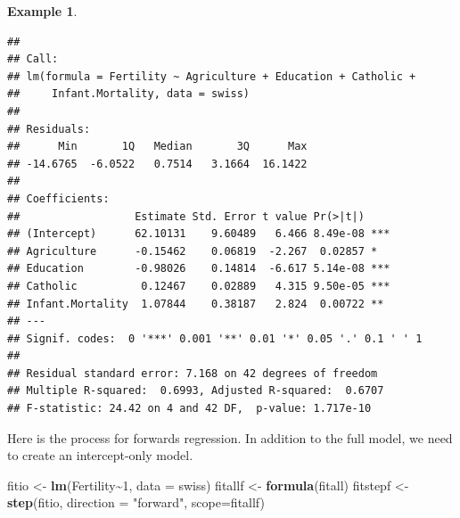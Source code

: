 \documentclass[
]{book}
\newenvironment{Shaded}{\begin{snugshade}}{\end{snugshade}}
\newcommand{\AttributeTok}[1]{\textcolor[rgb]{0.13,0.29,0.53}{#1}}
\newcommand{\DecValTok}[1]{\textcolor[rgb]{0.00,0.00,0.81}{#1}}
\newcommand{\FunctionTok}[1]{\textcolor[rgb]{0.13,0.29,0.53}{\textbf{#1}}}
\newcommand{\NormalTok}[1]{#1}
\newcommand{\OtherTok}[1]{\textcolor[rgb]{0.56,0.35,0.01}{#1}}
\newcommand{\SpecialCharTok}[1]{\textcolor[rgb]{0.81,0.36,0.00}{\textbf{#1}}}
\newcommand{\StringTok}[1]{\textcolor[rgb]{0.31,0.60,0.02}{#1}}
\theoremstyle{definition}
\theoremstyle{definition}
\newtheorem{example}{Example}[chapter]
\theoremstyle{definition}
\theoremstyle{definition}
\theoremstyle{remark}
\begin{document}
\begin{examplebox}
\begin{example}
\begin{verbatim}
## 
## Call:
## lm(formula = Fertility ~ Agriculture + Education + Catholic + 
##     Infant.Mortality, data = swiss)
## 
## Residuals:
##      Min       1Q   Median       3Q      Max 
## -14.6765  -6.0522   0.7514   3.1664  16.1422 
## 
## Coefficients:
##                  Estimate Std. Error t value Pr(>|t|)    
## (Intercept)      62.10131    9.60489   6.466 8.49e-08 ***
## Agriculture      -0.15462    0.06819  -2.267  0.02857 *  
## Education        -0.98026    0.14814  -6.617 5.14e-08 ***
## Catholic          0.12467    0.02889   4.315 9.50e-05 ***
## Infant.Mortality  1.07844    0.38187   2.824  0.00722 ** 
## ---
## Signif. codes:  0 '***' 0.001 '**' 0.01 '*' 0.05 '.' 0.1 ' ' 1
## 
## Residual standard error: 7.168 on 42 degrees of freedom
## Multiple R-squared:  0.6993, Adjusted R-squared:  0.6707 
## F-statistic: 24.42 on 4 and 42 DF,  p-value: 1.717e-10
\end{verbatim}

Here is the process for forwards regression. In addition to the full model, we need to create an intercept-only model.

\begin{Shaded}
\begin{Highlighting}[]
\NormalTok{fitio }\OtherTok{\textless{}{-}} \FunctionTok{lm}\NormalTok{(Fertility}\SpecialCharTok{\textasciitilde{}}\DecValTok{1}\NormalTok{, }\AttributeTok{data =}\NormalTok{ swiss)}
\NormalTok{fitallf }\OtherTok{\textless{}{-}} \FunctionTok{formula}\NormalTok{(fitall)}
\NormalTok{fitstepf }\OtherTok{\textless{}{-}} \FunctionTok{step}\NormalTok{(fitio, }\AttributeTok{direction =} \StringTok{"forward"}\NormalTok{,  }
                  \AttributeTok{scope=}\NormalTok{fitallf)}
\end{Highlighting}
\end{Shaded}


\end{example}
\end{examplebox}
\end{document}

